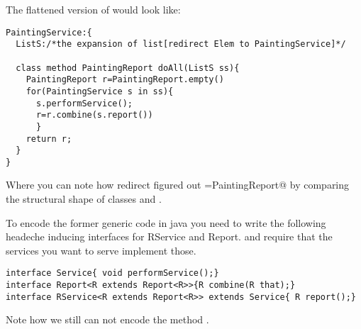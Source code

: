 The flattened version of \Q@PaintingService@ would look like:
\begin{lstlisting}
PaintingService:{
  ListS:/*the expansion of list[redirect Elem to PaintingService]*/
  
  class method PaintingReport doAll(ListS ss){
    PaintingReport r=PaintingReport.empty()
    for(PaintingService s in ss){
      s.performService();
      r=r.combine(s.report())
      }
    return r;
  }
}
\end{lstlisting}
Where you can note how redirect figured out \Q@R=PaintingReport@ by comparing the structural shape of
classes \Q@PaintingService@ and \Q@S@.

To encode the former generic code in java you need to write
the following headeche inducing interfaces for RService and Report.
and require that the services you want to serve implement those.
\begin{lstlisting}
interface Service{ void performService();}
interface Report<R extends Report<R>>{R combine(R that);}
interface RService<R extends Report<R>> extends Service{ R report();}
\end{lstlisting}
Note how we still can not encode the method \Q@empty@.
